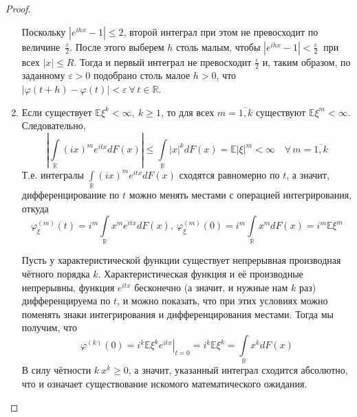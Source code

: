 \begin{proof}
\begin{enumerate}
            Поскольку $\left|e^{i h x}-1\right| \leqslant 2$, второй интеграл при этом не превосходит по величине~$\frac{\varepsilon}{2}$. 
            После этого выберем $h$ столь малым, чтобы $\left|e^{i h x}-1\right|<\frac{\varepsilon}{2}~$ при всех $|x| \leqslant R$. 
            Тогда и первый интеграл не превосходит $\frac{\varepsilon}{2}$ и, таким образом, по заданному $\varepsilon > 0$ подобрано столь малое $h >0$, что ${|\varphi(t+h)-\varphi(t)|<\varepsilon~ \forall \, t \in \mathbb{R}}$.
        \item 
            Если существует $\mathbb{E}\xi^{k}<\infty,~ k \geqslant 1$, то для всех $m = \overline{1, k}$ существуют $\mathbb{E}\xi^{m}<\infty$. Следовательно,
            \begin{equation*}
                \left|\int\limits_{\mathbb{R}}(i x)^{m} e^{i t x} d F(x)\right| \leqslant \int\limits_{\mathbb{R}}|x|^{k} d F(x)=\mathbb{E}|\xi|^{m}<\infty \quad \forall \, m = \overline{1, k}
            \end{equation*}
            Т.е. интегралы $\int\limits_{\mathbb{R}}(i x)^{m} e^{i t x} d F(x)$ сходятся равномерно по $t$, а значит, дифференцирование по $t$ можно менять местами с операцией интегрирования, откуда
            \begin{equation*}
                \varphi_{\xi}^{(m)}(t)=i^{m} \int\limits_{\mathbb{R}} x^{m} e^{i t x} d F(x),~ \varphi_{\xi}^{(m)}(0)=i^{m} \int\limits_{\mathbb{R}} x^{m} d F(x)=i^{m} \mathbb{E}\xi^{m}
            \end{equation*}
            
            Пусть у характеристической функции существует непрерывная производная чётного порядка $k$. 
            Характеристическая функция и её производные непрерывны, функция $e^{itx}$ бесконечно (а значит, и нужные нам $k$ раз) дифференцируема по $t$, 
            и можно показать, что при этих условиях можно поменять знаки интегрирования и дифференцирования местами.
            Тогда мы получим, что 
            $$ \varphi^{(k)}(0) = i^k \left.\mathbb{E}\xi^k e^{itx}\right|_{t=0} = i^k \mathbb{E}\xi^k = 
            \int\limits_{\mathbb{R}} x^k dF(x) $$
            В силу чётности $k ~ x^k \geqslant 0$, а значит, указанный интеграл сходится абсолютно, что и означает существование искомого математического ожидания.
    \end{enumerate}
\end{proof}

\pagebreak
